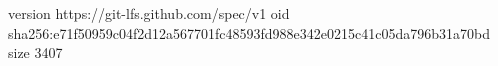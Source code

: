 version https://git-lfs.github.com/spec/v1
oid sha256:e71f50959c04f2d12a567701fc48593fd988e342e0215c41c05da796b31a70bd
size 3407

